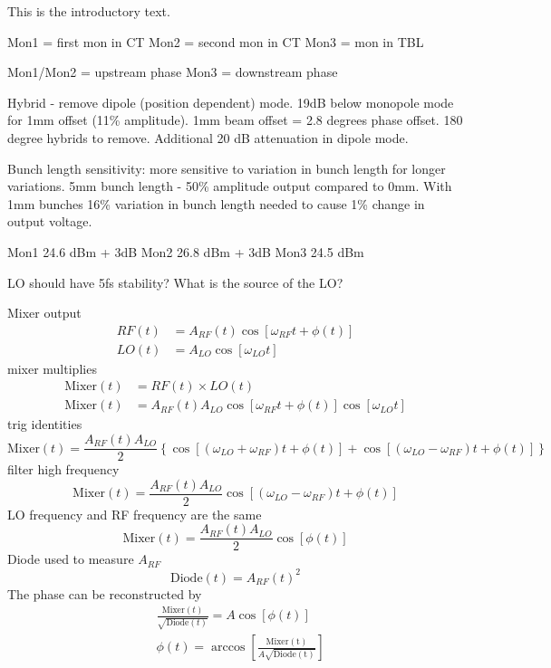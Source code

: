 
This is the introductory text.

Mon1 = first mon in CT
Mon2 = second mon in CT
Mon3 = mon in TBL

Mon1/Mon2 = upstream phase
Mon3 = downstream phase


Hybrid - remove dipole (position dependent) mode. 19dB below monopole mode for 1mm offset (11\% amplitude). 1mm beam offset = 2.8 degrees phase offset. 180 degree hybrids to remove. Additional 20 dB attenuation in dipole mode.

Bunch length sensitivity: more sensitive to variation in bunch length for longer variations. 5mm bunch length - 50\% amplitude output compared to 0mm. With 1mm bunches 16\% variation in bunch length needed to cause 1\% change in output voltage.

Mon1 24.6 dBm + 3dB
Mon2 26.8 dBm + 3dB
Mon3 24.5 dBm



LO should have 5fs stability? What is the source of the LO?

Mixer output
\begin{align}
RF(t) &= A_{RF}(t)\cos[\omega_{RF} t + \phi(t)] \\
LO(t) &= A_{LO}\cos[\omega_{LO} t]
\end{align}
mixer multiplies
\begin{align}
\mathrm{Mixer}(t) &= RF(t) \times LO(t) \\
\mathrm{Mixer}(t) &= A_{RF}(t)A_{LO}\cos[\omega_{RF} t + \phi(t)]\cos[\omega_{LO} t]
\end{align}
trig identities
\begin{equation}
\mathrm{Mixer}(t) = \frac{A_{RF}(t)A_{LO}}{2}\left\lbrace\cos[(\omega_{LO} + \omega_{RF})t + \phi(t)] + \cos[(\omega_{LO} - \omega_{RF})t + \phi(t)]\right\rbrace
\end{equation}
filter high frequency
\begin{equation}
\mathrm{Mixer}(t) = \frac{A_{RF}(t)A_{LO}}{2}\cos[(\omega_{LO} - \omega_{RF})t + \phi(t)]
\label{e:mixOutAnyFreq} 
\end{equation}
LO frequency and RF frequency are the same
\begin{equation}
\mathrm{Mixer}(t) = \frac{A_{RF}(t)A_{LO}}{2}\cos[\phi(t)]
\label{e:mixOutSameFreq} 
\end{equation}
Diode used to measure \(A_{RF}\)
\begin{equation}
\mathrm{Diode}(t) = A_{RF}(t)^2
\label{e:idealDiode}
\end{equation}
The phase can be reconstructed by
\begin{align}
&\frac{\mathrm{Mixer}(t)}{\sqrt{\mathrm{Diode}(t)}} = A\cos[\phi(t)] \label{e:mixOverSqrtDio} \\
&\phi(t) = \arccos\left[\frac{\mathrm{Mixer(t)}}{A\sqrt{\mathrm{Diode(t)}}}\right]
\label{e:phaseRecIdeal} 
\end{align}

